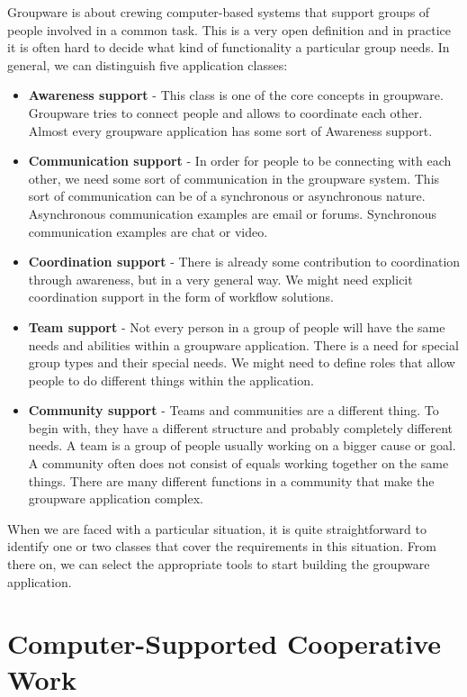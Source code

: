 Groupware is about crewing computer-based systems that support groups of people involved in a common task. This is a very open definition and in practice it is often hard to decide what kind of functionality a particular group needs. In general, we can distinguish five application classes:

\begin{itemize}
\item{\textbf{Awareness support} - This class is one of the core concepts in groupware. Groupware tries to connect people and allows to coordinate each other. Almost every groupware application has some sort of Awareness support.}
\item{\textbf{Communication support} - In order for people to be connecting with each other, we need some sort of communication in the groupware system. This sort of communication can be of a synchronous or asynchronous nature. Asynchronous communication examples are email or forums. Synchronous communication examples are chat or video.}
\item{\textbf{Coordination support} - There is already some contribution to coordination through awareness, but in a very general way. We might need explicit coordination support in the form of workflow solutions.}
\item{\textbf{Team support} - Not every person in a group of people will have the same needs and abilities within a groupware application. There is a need for special group types and their special needs. We might need to define roles that allow people to do different things within the application.}
\item{\textbf{Community support} - Teams and communities are a different thing. To begin with, they have a different structure and probably completely different needs. A team is a group of people usually working on a bigger cause or goal. A community often does not consist of equals working together on the same things. There are many different functions in a community that make the groupware application complex.}
\end{itemize}

When we are faced with a particular situation, it is quite straightforward to identify one or two classes that cover the requirements in this situation. From there on, we can select the appropriate tools to start building the groupware application.

\section{Computer-Supported Cooperative Work}

